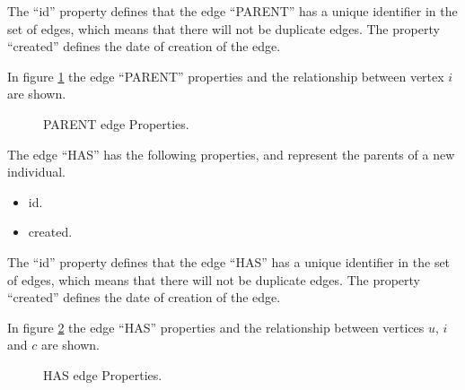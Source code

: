 The “id” property defines that the edge “PARENT” has a unique identifier in the set of edges, which means that there will not be duplicate edges.
The property “created” defines the date of creation of the edge.

In figure \ref{fig:Parent_edge} the edge “PARENT” properties and the relationship between vertex $i$ are shown.

\begin{figure}
\captionsetup{justification=centering,margin=2cm}
\centering
\setlength\fboxsep{0pt}
\setlength\fboxrule{0.7pt}
\caption{PARENT edge Properties.}
\label{fig:Parent_edge}       
\end{figure}

The edge “HAS” has the following properties, and represent the parents of a new individual.
\begin{itemize} 
\item id. 
\item created. 
\end{itemize}

The “id” property defines that the edge “HAS” has a unique identifier in the set of edges, which means that there will not be duplicate edges.
The property “created” defines the date of creation of the edge.

In figure \ref{fig:Has_edge} the edge “HAS” properties and the relationship between vertices $u$, $i$ and $c$ are shown.

\begin{figure}
\captionsetup{justification=centering,margin=2cm}
\centering
\setlength\fboxsep{0pt}
\setlength\fboxrule{0.7pt}
\caption{HAS edge Properties.}
\label{fig:Has_edge}       
\end{figure}

